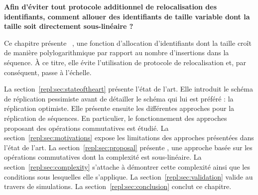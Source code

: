 \textbf{Afin d'éviter tout protocole additionnel de relocalisation des
identifiants, comment allouer des identifiants de taille variable dont la taille
soit directement sous-linéaire ?}

Ce chapitre présente \LSEQ~\cite{nedelec2013concurrency, nedelec2013lseq}, une
fonction d'allocation d'identifiants dont la taille croît de manière
polylogarithmique par rapport au nombre d'insertions dans la séquence. À ce
titre, elle évite l'utilisation de protocole de relocalisation et, par
conséquent, passe à l'échelle.

La section~\ref{repl:sec:stateoftheart} présente l'état de l'art. Elle introduit
le schéma de réplication pessimiste avant de détailler le schéma qui lui est
préféré : la réplication optimiste. Elle présente ensuite les différentes
approches pour la réplication de séquences. En particulier, le fonctionnement
des approches proposant des opérations commutatives est étudié. La
section~\ref{repl:sec:motivations} expose les limitations des approches
présentées dans l'état de l'art. La section~\ref{repl:sec:proposal} présente
\LSEQ, une approche basée sur les opérations commutatives dont la complexité est
sous-linéaire. La section~\ref{repl:sec:complexity} s'attache à démontrer cette
complexité ainsi que les conditions sous lesquelles elle s'applique. La
section~\ref{repl:sec:validation} valide \LSEQ au travers de simulations. La
section~\ref{repl:sec:conclusion} conclut ce chapitre.



